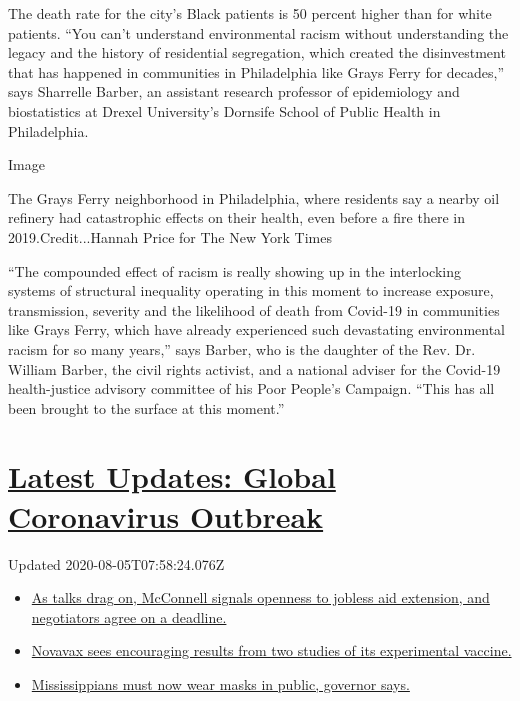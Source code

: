 The death rate for the city's Black patients is 50 percent higher than
for white patients. ``You can't understand environmental racism without
understanding the legacy and the history of residential segregation,
which created the disinvestment that has happened in communities in
Philadelphia like Grays Ferry for decades,'' says Sharrelle Barber, an
assistant research professor of epidemiology and biostatistics at Drexel
University's Dornsife School of Public Health in Philadelphia.

Image

The Grays Ferry neighborhood in Philadelphia, where residents say a
nearby oil refinery had catastrophic effects on their health, even
before a fire there in 2019.Credit...Hannah Price for The New York Times

``The compounded effect of racism is really showing up in the
interlocking systems of structural inequality operating in this moment
to increase exposure, transmission, severity and the likelihood of death
from Covid-19 in communities like Grays Ferry, which have already
experienced such devastating environmental racism for so many years,''
says Barber, who is the daughter of the Rev. Dr. William Barber, the
civil rights activist, and a national adviser for the Covid-19
health-justice advisory committee of his Poor People's Campaign. ``This
has all been brought to the surface at this moment.''

\hypertarget{latest-updates-global-coronavirus-outbreak}{%
\section{\texorpdfstring{\href{https://www.nytimes3xbfgragh.onion/2020/08/04/world/coronavirus-cases.html?action=click\&pgtype=Article\&state=default\&region=MAIN_CONTENT_1\&context=storylines_live_updates}{Latest
Updates: Global Coronavirus
Outbreak}}{Latest Updates: Global Coronavirus Outbreak}}\label{latest-updates-global-coronavirus-outbreak}}

Updated 2020-08-05T07:58:24.076Z

\begin{itemize}
\tightlist
\item
  \href{https://www.nytimes3xbfgragh.onion/2020/08/04/world/coronavirus-cases.html?action=click\&pgtype=Article\&state=default\&region=MAIN_CONTENT_1\&context=storylines_live_updates\#link-762df92}{As
  talks drag on, McConnell signals openness to jobless aid extension,
  and negotiators agree on a deadline.}
\item
  \href{https://www.nytimes3xbfgragh.onion/2020/08/04/world/coronavirus-cases.html?action=click\&pgtype=Article\&state=default\&region=MAIN_CONTENT_1\&context=storylines_live_updates\#link-1228a480}{Novavax
  sees encouraging results from two studies of its experimental
  vaccine.}
\item
  \href{https://www.nytimes3xbfgragh.onion/2020/08/04/world/coronavirus-cases.html?action=click\&pgtype=Article\&state=default\&region=MAIN_CONTENT_1\&context=storylines_live_updates\#link-794484ed}{Mississippians
  must now wear masks in public, governor says.}
\end{itemize}

